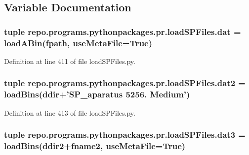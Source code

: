 \subsection{Variable Documentation}
\hypertarget{namespacerepo_1_1programs_1_1pythonpackages_1_1pr_1_1loadSPFiles_a83183382a5277a75ee1031f6ef284691}{
\subsubsection[{dat}]{\setlength{\rightskip}{0pt plus 5cm}tuple repo.\-programs.\-pythonpackages.\-pr.\-load\-S\-P\-Files.\-dat = {\bf load\-A\-Bin}({\bf fpath}, use\-Meta\-File=True)}}\label{namespacerepo_1_1programs_1_1pythonpackages_1_1pr_1_1loadSPFiles_a83183382a5277a75ee1031f6ef284691}


Definition at line 411 of file load\-S\-P\-Files.\-py.

\hypertarget{namespacerepo_1_1programs_1_1pythonpackages_1_1pr_1_1loadSPFiles_aed6d44730b91f4104569281ef51b335d}{
\subsubsection[{dat2}]{\setlength{\rightskip}{0pt plus 5cm}tuple repo.\-programs.\-pythonpackages.\-pr.\-load\-S\-P\-Files.\-dat2 = {\bf load\-Bins}({\bf ddir}+'S\-P\-\_\-aparatus 5256. Medium')}}\label{namespacerepo_1_1programs_1_1pythonpackages_1_1pr_1_1loadSPFiles_aed6d44730b91f4104569281ef51b335d}


Definition at line 413 of file load\-S\-P\-Files.\-py.

\hypertarget{namespacerepo_1_1programs_1_1pythonpackages_1_1pr_1_1loadSPFiles_a450ab2273d44a0e76443c6e31b162908}{
\subsubsection[{dat3}]{\setlength{\rightskip}{0pt plus 5cm}tuple repo.\-programs.\-pythonpackages.\-pr.\-load\-S\-P\-Files.\-dat3 = {\bf load\-Bins}({\bf ddir2}+{\bf fname2}, use\-Meta\-File=True)}}\label{namespacerepo_1_1programs_1_1pythonpackages_1_1pr_1_1loadSPFiles_a450ab2273d44a0e76443c6e31b162908}



